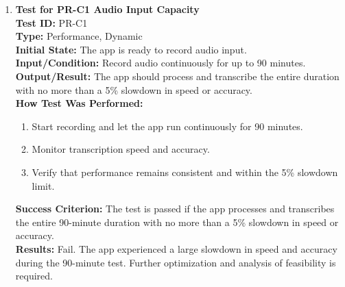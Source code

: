 \documentclass[12pt, titlepage]{article}
\begin{document}
\begin{enumerate}
    \item \textbf{Test for PR-C1 Audio Input Capacity} \\
      \newline
      \textbf{Test ID:} PR-C1 \\
      \textbf{Type:} Performance, Dynamic \\
      \textbf{Initial State:} The app is ready to record audio input. \\
      \textbf{Input/Condition:} Record audio continuously for up to 90 minutes. \\
      \textbf{Output/Result:} The app should process and transcribe the entire duration with no more than a 5\% slowdown 
      in speed or accuracy. \\
      \textbf{How Test Was Performed:}
      \begin{enumerate}
          \item Start recording and let the app run continuously for 90 minutes.
          \item Monitor transcription speed and accuracy.
          \item Verify that performance remains consistent and within the 5\% slowdown limit.
      \end{enumerate}
      \textbf{Success Criterion:} The test is passed if the app processes and transcribes the entire 90-minute duration with no more than a 5\% slowdown in speed or accuracy.\\
      \textbf{Results:} Fail. The app experienced a large slowdown in speed and accuracy during the 90-minute test. Further optimization and analysis of feasibility is required.\\


\end{enumerate}
\end{document}
